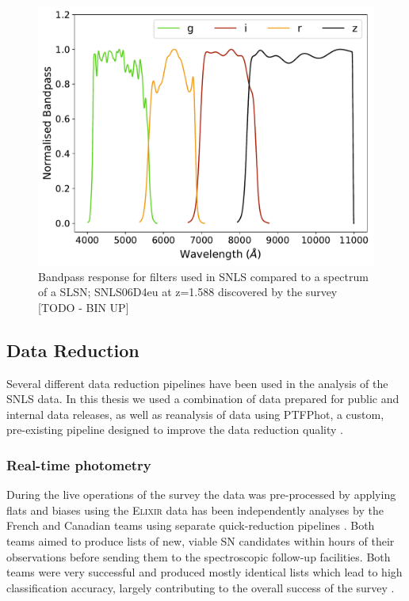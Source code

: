 \begin{figure}
  \centering
  \includegraphics[scale=0.8]{Figures/Chapter2/SNLS_filters.pdf}
	\caption{Bandpass response for filters used in SNLS compared to a 				spectrum of a SLSN; SNLS06D4eu at z=1.588 discovered by the 			  survey [TODO - BIN UP]}
    \label{fig:SNLSFilters}
\end{figure}

\subsection{Data Reduction}
Several different data reduction pipelines have been used in the analysis of the SNLS data. In this thesis we used a combination of data prepared for public and internal data releases, as well as reanalysis of data using PTFPhot, a custom, pre-existing pipeline designed to improve the data reduction quality \citep{Firth2015}.

\subsubsection{Real-time photometry}
During the live operations of the survey the data was pre-processed by applying flats and biases using the \textsc{Elixir} \citep{Magnier2004} data has been independently analyses by the French and Canadian teams using separate quick-reduction pipelines \citep{Astier2006,Bazin2011}. Both teams aimed to produce lists of new, viable SN candidates within hours of their observations before sending them to the spectroscopic follow-up facilities. Both teams were very successful and produced mostly identical lists which lead to high classification accuracy, largely contributing to the overall success of the survey \citep{Pritchet2004}.

